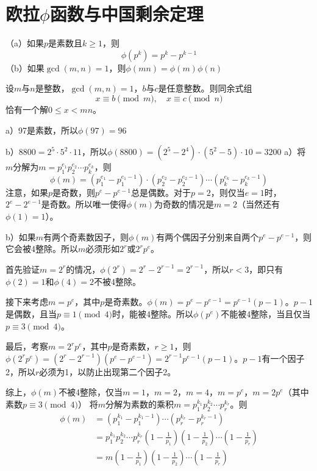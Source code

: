 \chapter{欧拉$\phi$函数与中国剩余定理}
\begin{theorem}
（a）如果$p$是素数且$k\ge1$，则
\[\phi(p^k)=p^k-p^{k-1}\]
（b）如果$\gcd(m, n)=1$，则$\phi(mn)=\phi(m)\phi(n)$
\end{theorem}
\begin{theorem}[中国剩余定理]
设$m$与$n$是整数，$\gcd(m,n)=1$，$b$与$c$是任意整数。则同余式组
\[x\equiv b\pmod m,\quad x\equiv c\pmod n\]
恰有一个解$0\le x<mn$。
\end{theorem}
%
\exercise a）97是素数，所以$\phi(97)=96$\par
b）$8800=2^5\cdot5^2\cdot11$，所以$\phi(8800)=(2^5-2^4)\cdot(5^2-5)\cdot10=3200$
%
\exercise a）将$m$分解为$m=p_1^{e_1}p_2^{e_2}\cdots p_k^{e_k}$，则
\[\phi(m)=(p_1^{e_1}-p_1^{e_1-1})\cdot(p_2^{e_2}-p_2^{e_2-1})\cdots(p_k^{e_k}-p_k^{e_k-1})\]
注意，如果$p$是奇数，则$p^e-p^{e-1}$总是偶数。对于$p=2$，则仅当$e=1$时，$2^e-2^{e-1}$是奇数。所以唯一使得$\phi(m)$为奇数的情况是$m=2$（当然还有$\phi(1)=1$）。\par
b）如果$m$有两个奇素数因子，则$\phi(m)$有两个偶因子分别来自两个$p^e-p^{e-1}$，则它会被4整除。所以$m$必须形如$2^r$或$2^rp^e$。\par
首先验证$m=2^r$的情况，$\phi(2^r)=2^r-2^{r-1}=2^{r-1}$，所以$r<3$，即只有$\phi(2)=1$和$\phi(4)=2$不被4整除。\par
接下来考虑$m=p^e$，其中$p$是奇素数。$\phi(m)=p^e-p^{e-1}=p^{e-1}(p-1)$。$p-1$是偶数，且当$p\equiv 1\pmod4$时，能被4整除。所以$\phi(p^e)$不能被4整除，当且仅当$p\equiv 3\pmod4$。\par
最后，考察$m=2^rp^e$，其中$p$是奇素数，$r\ge1$，则$\phi(2^rp^e)=(2^r-2^{r-1})(p^e-p^{e-1})=2^{r-1}p^{e-1}(p-1)$。$p-1$有一个因子2，所以$r$必须为1，以防止出现第二个因子2。\par
综上，$\phi(m)$不被4整除，仅当$m=1$，$m=2$，$m=4$，$m=p^e$，$m=2p^e$（其中素数$p\equiv3\pmod4$）
%
\exercise 将$m$分解为素数的乘积$m=p_1^{k_1}p_2^{k_2}\cdots p_r^{k_r}$。则
\begin{align*}
\phi(m)&=(p_1^{k_1}-p_1^{k_1-1})\cdots(p_r^{k_r}-p_r^{k_r-1})\\
&=p_1^{k_1}p_2^{k_2}\cdots p_r^{k_r}\left(1-\frac{1}{p_1}\right)\left(1-\frac{1}{p_2}\right)\cdots\left(1-\frac{1}{p_r}\right) \\
&=m\left(1-\frac{1}{p_1}\right)\left(1-\frac{1}{p_2}\right)\cdots\left(1-\frac{1}{p_r}\right) 
\end{align*}
